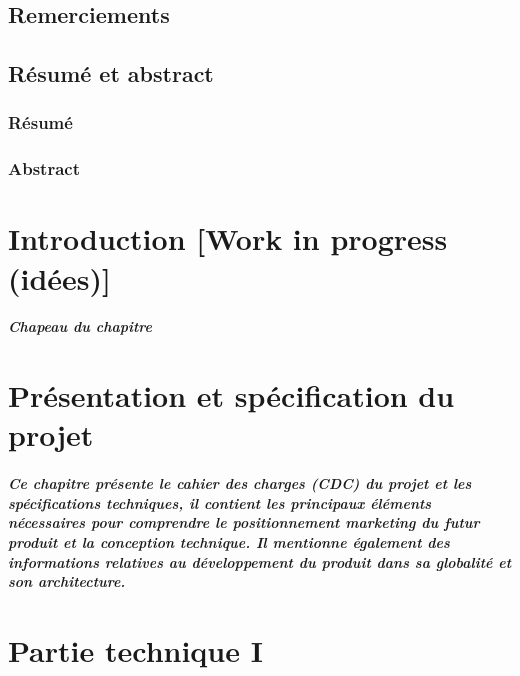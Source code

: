 \documentclass[12pt, french]{report}
\begin{document}

\clearpage

\thispagestyle{empty}
\section*{Remerciements}

\clearpage
\thispagestyle{empty}
\section*{Résumé et abstract}
\subsection*{Résumé}

\subsection*{Abstract}

\clearpage
\setcounter{page}{1}
\tableofcontents
\listoffigures

\clearpage

\chapter{Introduction [Work in progress (idées)]}
\paragraph{Chapeau du chapitre}

\clearpage

\chapter{Présentation et spécification du projet}
\paragraph{Ce chapitre présente le cahier des charges (CDC) du projet et les spécifications techniques, il contient les principaux éléments nécessaires pour comprendre le positionnement marketing du futur produit et la conception technique. Il mentionne également des informations relatives au développement du produit dans sa globalité et son architecture.}

\clearpage

\chapter{Partie technique I}
\end{document}
